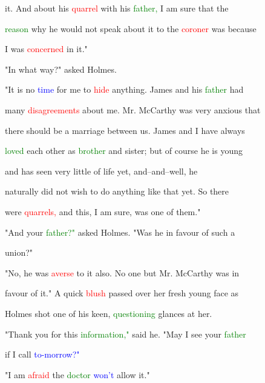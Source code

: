  it. And about his \textcolor{red}{quarrel} with his \textcolor{green}{father,} I am sure that the

 \textcolor{green}{reason} why he would not speak about it to the \textcolor{red}{coroner} was because

 I was \textcolor{red}{concerned} in it."



 "In what way?" asked Holmes.



 "It is no \textcolor{blue}{time} for me to \textcolor{red}{hide} anything. James and his \textcolor{green}{father} had

 many \textcolor{red}{disagreements} about me. Mr. McCarthy was very \textcolor{BurntOrange}{anxious} that

 there should be a \textcolor{BurntOrange}{marriage} between us. James and I have always

 \textcolor{green}{loved} each other as \textcolor{green}{brother} and sister; but of course he is \textcolor{BurntOrange}{young}

 and has seen very little of life yet, and--and--well, he

 naturally did not wish to do anything like that yet. So there

 were \textcolor{red}{quarrels,} and this, I am sure, was one of them."



 "And your \textcolor{green}{father?"} asked Holmes. "Was he in favour of such a

 union?"



 "No, he was \textcolor{red}{averse} to it also. No one but Mr. McCarthy was in

 favour of it." A quick \textcolor{red}{blush} passed over her fresh \textcolor{BurntOrange}{young} face as

 Holmes \textcolor{BurntOrange}{shot} one of his keen, \textcolor{green}{questioning} glances at her.



 "Thank you for this \textcolor{green}{information,"} said he. "May I see your \textcolor{green}{father}

 if I call \textcolor{blue}{to-morrow?"}



 "I am \textcolor{red}{afraid} the \textcolor{green}{doctor} \textcolor{blue}{won't} allow it."



